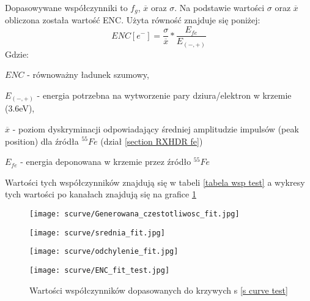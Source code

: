 Dopasowywane współczynniki to $f_g$, $\overline{x}$ oraz $\sigma$. Na podstawie wartości $\sigma$ oraz $\overline{x}$ obliczona została wartość ENC. Użyta równość znajduje się poniżej:
\begin{equation}
        ENC [e^-] = \frac{\sigma}{\overline{x}} * \frac{E_{fe}}{E_{(-,+)}}
\end{equation}
Gdzie:
\begin{description}
        \item $ENC$  - równoważny ładunek szumowy,
        \item $E_{(-,+)}$ - energia potrzebna na wytworzenie pary dziura/elektron w krzemie (3.6eV),
        \item $\overline{x}$ - poziom dyskryminacji odpowiadający średniej amplitudzie impulsów (peak position) dla źródła ${}^{55}Fe$ (dział \ref{section RXHDR fe})
        \item $E_{fe}$ -  energia deponowana w krzemie przez źródło ${}^{55}Fe$
\end{description}

Wartości tych współczynników znajdują się w tabeli \ref{tabela wsp test} a wykresy tych wartości po kanałach znajdują się na grafice \ref{test fit wsp wyk} 

\begin{figure}
        \begin{multicols}{2}
                \texttt{[image: scurve/Generowana\_czestotliwosc\_fit.jpg]} \par
                \texttt{[image: scurve/srednia\_fit.jpg]} \par       
        \end{multicols} \hfill
        \begin{multicols}{2}
                \texttt{[image: scurve/odchylenie\_fit.jpg]} \par
                \texttt{[image: scurve/ENC\_fit\_test.jpg]} \par
        \end{multicols}
        \caption{Wartości współczynników dopasowanych do krzywych s \ref{s curve test}}
        \label{test fit wsp wyk}
\end{figure}


